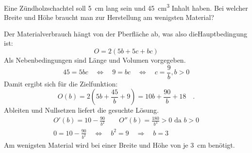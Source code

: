 \documentclass[auto-toc=false,babel=ngerman]{arbeitsblatt}
\begin{document}
\begin{question}
  Eine Zündholzschachtel soll \SI{5}{\centi\metre} lang sein und
  \SI{45}{\centi\metre\cubed} Inhalt haben.  Bei welcher Breite und Höhe
  braucht man zur Herstellung am wenigsten Material?
\end{question}
\begin{solution}
  Der Materialverbrauch hängt von der Pberfläche ab, was also
  dieHauptbedingung ist:
  \[ O = 2(5b+5c+bc) \]
  Als Nebenbedingungen sind Länge und Volumen vorgegeben.
  \[
    45 = 5bc \quad\Leftrightarrow\quad
    9 = bc \quad\Leftrightarrow\quad
    c = \frac{9}{b}, b>0
  \]
  Damit ergibt sich für die Zielfunktion:
  \[ O(b) = 2(5b + \frac{45}{b} + 9) = 10b + \frac{90}{b} + 18 \quad. \]
  Ableiten und Nullsetzen liefert die gesuchte Lösung.
  \begin{gather*}
    O'(b) = 10 - \frac{90}{b^2} \qquad
    O''(b) = \frac{180}{b^3} > 0 \text{ da } b>0 \\
    0 = 10 - \frac{90}{b^2} \quad\Leftrightarrow\quad
    b^2 = 9 \quad\Rightarrow\quad
    b = 3
  \end{gather*}
  Am wenigsten Material wird bei einer Breite und Höhe von je
  \SI{3}{\centi\metre} benötigt.
\end{solution}
\end{document}
